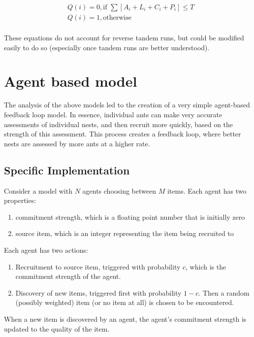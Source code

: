\documentclass{article}
\begin{document}
\begin{equation}
\begin{aligned}
  & Q(i) = 0, \text{if    } \sum [A_i + L_i + C_i + P_i] \leq T \\
  & Q(i) = 1, \text{otherwise} \\
\end{aligned}
\end{equation}

These equations do not account for reverse tandem runs, but could be modified easily to do so (especially once tandem runs are better understood).



\section{Agent based model}

The analysis of the above models led to the creation of a very simple agent-based feedback loop model.
In essence, individual ants can make very accurate assessments of individual nests, and then recruit more quickly, based on the strength of this assessment.
This process creates a feedback loop, where better nests are assessed by more ants at a higher rate.

\subsection{Specific Implementation}
Consider a model with $N$ agents choosing between $M$ items.
Each agent has two properties:
\begin{enumerate}
    \item commitment strength, which is a floating point number that is initially zero
    \item source item, which is an integer representing the item being recruited to
\end{enumerate}
Each agent has two actions:
\begin{enumerate}
    \item Recruitment to source item, triggered with probability $c$, which is the commitment strength of the agent.
    \item Discovery of new items, triggered first with probability $1 - c$. Then a random (possibly weighted) item (or no item at all) is chosen to be encountered.
\end{enumerate}
When a new item is discovered by an agent, the agent's commitment strength is updated to the quality of the item.
\end{document}
